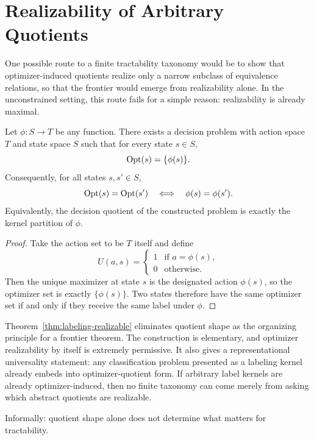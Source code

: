\section{Realizability of Arbitrary Quotients}

One possible route to a finite tractability taxonomy would be to show that optimizer-induced quotients realize only a narrow subclass of equivalence relations, so that the frontier would emerge from realizability alone. In the unconstrained setting, this route fails for a simple reason: realizability is already maximal.

\begin{theorem}\label{thm:labeling-realizable}
Let $\phi : S \to T$ be any function. There exists a decision problem with action space $T$ and state space $S$ such that for every state $s \in S$,
\[
\operatorname{Opt}(s) = \{\phi(s)\}.
\]
Consequently, for all states $s,s' \in S$,
\[
\operatorname{Opt}(s)=\operatorname{Opt}(s') \quad\Longleftrightarrow\quad \phi(s)=\phi(s').
\]
Equivalently, the decision quotient of the constructed problem is exactly the kernel partition of $\phi$.
\end{theorem}

\begin{proof}
Take the action set to be $T$ itself and define
\[
U(a,s)=
\begin{cases}
1 & \text{if } a=\phi(s),\\
0 & \text{otherwise.}
\end{cases}
\]
Then the unique maximizer at state $s$ is the designated action $\phi(s)$, so the optimizer set is exactly $\{\phi(s)\}$. Two states therefore have the same optimizer set if and only if they receive the same label under $\phi$.
\end{proof}

Theorem~\ref{thm:labeling-realizable} eliminates quotient shape as the organizing principle for a frontier theorem. The construction is elementary, and optimizer realizability by itself is extremely permissive. It also gives a representational universality statement: any classification problem presented as a labeling kernel already embeds into optimizer-quotient form. If arbitrary label kernels are already optimizer-induced, then no finite taxonomy can come merely from asking which abstract quotients are realizable.

\par\medskip
\noindent
Informally: quotient shape alone does not determine what matters for tractability.
\par\medskip

